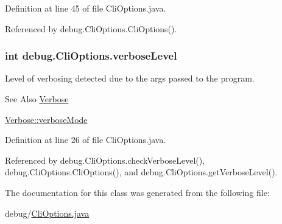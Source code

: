 Definition at line 45 of file Cli\-Options.\-java.



Referenced by debug.\-Cli\-Options.\-Cli\-Options().

\hypertarget{a00006_a3a7a5235344ee51904e2314dd5fbf7ec}{
\subsubsection[{verbose\-Level}]{\setlength{\rightskip}{0pt plus 5cm}int debug.\-Cli\-Options.\-verbose\-Level\hspace{0.3cm}{\ttfamily [protected]}}}\label{a00006_a3a7a5235344ee51904e2314dd5fbf7ec}


Level of verbosing detected due to the args passed to the program. 

\begin{DoxySeeAlso}{See Also}
\hyperlink{a00035}{Verbose} 

\hyperlink{a00035_a2269eebcfd65682c66c8401d59bb0d70}{Verbose\-::verbose\-Mode} 
\end{DoxySeeAlso}


Definition at line 26 of file Cli\-Options.\-java.



Referenced by debug.\-Cli\-Options.\-check\-Verbose\-Level(), debug.\-Cli\-Options.\-Cli\-Options(), and debug.\-Cli\-Options.\-get\-Verbose\-Level().



The documentation for this class was generated from the following file\-:\begin{DoxyCompactItemize}
\item 
debug/\hyperlink{a00041}{Cli\-Options.\-java}\end{DoxyCompactItemize}
